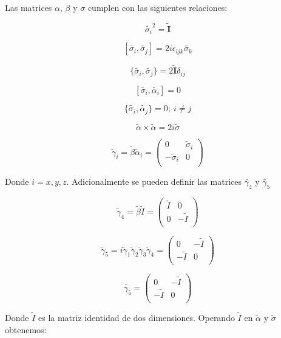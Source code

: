\documentclass[a4paper, 12pt]{article} %
\begin{document}
Las matrices $\alpha$, $\beta$ y $\sigma$ cumplen con las siguientes relaciones:

\[
\widetilde{\sigma_i}^2 = \widetilde{\mathbf{I}}
\]

\[
[\widetilde{\sigma_i}, \widetilde{\sigma_j}] = 2i\epsilon_{ijk}\widetilde{\sigma_k}
\]

\[
\{\widetilde{\sigma_i},\widetilde{\sigma_j}\} = 2\widetilde{\mathbf{I}}\delta_{ij}
\]

\[
[\widetilde{\sigma_i}, \widetilde{\alpha_i}] = 0
\]

\[
\{ \widetilde{\sigma_i}, \widetilde{\alpha_j} \} = 0;  \ i \neq j
\]

\[
\widetilde{\alpha} \times \widetilde{\alpha} = 2i\widetilde{\sigma}
\]

\[
\widetilde{\gamma}_i = \widetilde{\beta}\widetilde{\alpha}_i = 
\begin{pmatrix}
0 & \widetilde{\sigma}_i \\
-\widetilde{\sigma}_i & 0 \\
\end{pmatrix}
\]

Donde $i = x, y, z$. Adicionalmente se pueden definir las matrices $\widetilde{\gamma_4}$ y $\widetilde{\gamma_5}$


\[
\widetilde{\gamma}_4 = \widetilde{\beta}\widetilde{I} = 
\begin{pmatrix}
\widetilde{I} & 0 \\
0 & -\widetilde{I}  \\
\end{pmatrix}
\]

\begin{equation}\label{eq:gamma5}
\widetilde{\gamma}_5 = i\widetilde{\gamma}_1 \widetilde{\gamma}_2 \widetilde{\gamma}_3 \widetilde{\gamma}_4 = 
\begin{pmatrix}
0 & -\widetilde{I} \\
-\widetilde{I} & 0 \\
\end{pmatrix}
\end{equation}


\[
\widetilde{\gamma_5} = 
\begin{pmatrix} 
0 & - \widetilde{I} \\
-\widetilde{I} & 0 \\
\end{pmatrix}
\]

Donde $\widetilde{I}$ es la matriz identidad de dos dimensiones. Operando  $\widetilde{I}$ 
en $\widetilde{\alpha}$ y $\widetilde{\sigma}$ obtenemos:
\end{document}
